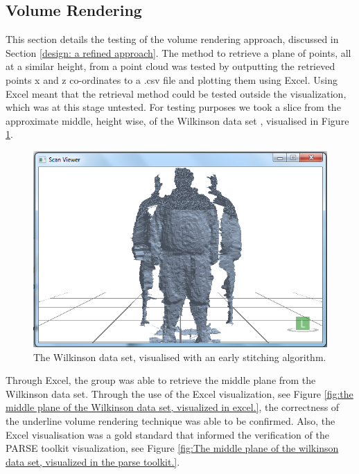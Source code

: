 \subsection{Volume Rendering}
\label{testing: volume rendering}
This section details the testing of the volume rendering approach, discussed in Section \ref{design: a refined approach}. 
The method to retrieve a plane of points, all at a similar height, from a point cloud was tested by outputting the retrieved points x and z co-ordinates to a .csv file and plotting them using Excel. 
Using Excel meant that the retrieval method could be tested outside the visualization, which was at this stage untested. 
For testing purposes we took a slice from the approximate middle, height wise, of the Wilkinson data set , visualised in Figure \ref{fig:the wilkinson data set, visualised with an early stitching algorithm}.\\

\begin{figure}[h]
\begin{center}
\includegraphics[scale=0.4]{./testing/wilko1} 
\end{center}
\caption{The Wilkinson data set, visualised with an early stitching algorithm.}
\label{fig:the wilkinson data set, visualised with an early stitching algorithm}
\end{figure}

Through Excel, the group was able to retrieve the middle plane from the Wilkinson data set. 
Through the use of the Excel visualization, see Figure \ref{fig:the middle plane of the Wilkinson data set, visualized in excel.}, the correctness of the underline volume rendering technique was able to be confirmed.
Also, the Excel visualisation was a gold standard that informed the verification of the PARSE toolkit visualization, see Figure \ref{fig:The middle plane of the wilkinson data set, visualized in the parse toolkit.}.\\ 

